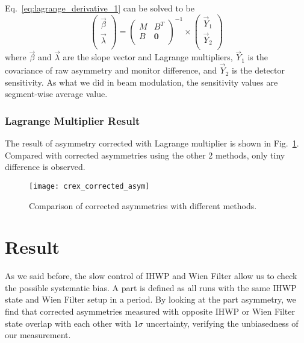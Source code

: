Eq.~\ref{eq:lagrange_derivative_1} can be solved to be
\begin{equation}
    \begin{pmatrix}
	\vec{\beta} \\
	\vec{\lambda}	\\
    \end{pmatrix}
    =
    \begin{pmatrix}
	M   & B^T   \\
	B   & \bm{0}	\\
    \end{pmatrix}^{-1}
    \times
    \begin{pmatrix}
	\vec{Y}_1   \\
	\vec{Y}_2   \\
    \end{pmatrix}
\end{equation}
where $\vec{\beta}$ and $\vec{\lambda}$ are the slope vector and Lagrange multipliers,
$\vec{Y}_1$ is the covariance of raw asymmetry and monitor difference, and $\vec{Y}_2$
is the detector sensitivity. As what we did in beam modulation, the sensitivity
values are segment-wise average value.

\subsubsection{Lagrange Multiplier Result}
The result of asymmetry corrected with Lagrange multiplier is shown in 
Fig.~\ref{fig:crex_corrected_asym}. Compared with corrected asymmetries using
the other 2 methods, only tiny difference is observed.
\begin{figure}[H]
    \centering
    \texttt{[image: crex\_corrected\_asym]}
    \caption{Comparison of corrected asymmetries with different methods.}
    \label{fig:crex_corrected_asym}
\end{figure}

\section{Result}
As we said before, the slow control of IHWP and Wien Filter allow us to check
the possible systematic bias. A part is defined as all runs with the same IHWP state
and Wien Filter setup in a period. By looking at the part asymmetry, we find that 
corrected asymmetries measured with opposite IHWP or Wien Filter state overlap
with each other with $1\sigma$ uncertainty, verifying the unbiasedness of our
measurement.


